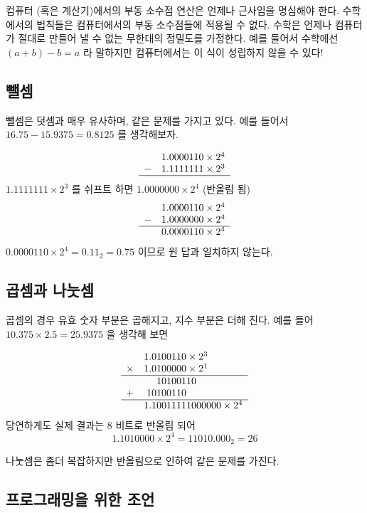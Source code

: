 컴퓨터 (혹은 계산기)에서의 부동 소수점 연산은 언제나 근사임을 명심해야 한다.
수학에서의 법칙들은 컴퓨터에서의 부동 소수점들에 적용될 수 없다. 수학은 언제나
컴퓨터가 절대로 만들어 낼 수 없는 무한대의 정밀도를 가정한다. 예를 들어서
수학에선 $(a + b) - b = a$ 라 말하지만 컴퓨터에서는 이 식이 성립하지 않을 수 있다!

\subsection{뺄셈}
뺄셈은 덧셈과 매우 유사하며, 같은 문제를 가지고 있다. 예를 들어서 $16.75 - 15.9375 = 0.8125$
를 생각해보자. 

\[
\begin{array}{rr}
 & 1.0000110 \times 2^4 \\
-& 1.1111111 \times 2^3 \\ \hline
\end{array}
\]
$1.1111111 \times 2^3$ 를 쉬프트 하면 $1.0000000 \times 2^4$ (반올림 됨)
\[
\begin{array}{rr}
 & 1.0000110 \times 2^4 \\
-& 1.0000000 \times 2^4 \\ \hline
 & 0.0000110 \times 2^4
\end{array}
\]
$0.0000110 \times 2^4 = 0.11_2 = 0.75$ 이므로 원 답과 일치하지 않는다. 

\subsection{곱셈과 나눗셈}

곱셈의 경우 유효 숫자 부분은 곱해지고, 지수 부분은 더해 진다. 예를 들어 
$10.375 \times 2.5 = 25.9375$ 을 생각해 보면 

\[
\begin{array}{rr@{}l}
 &  1.0&100110 \times 2^3 \\
\times &  1.0&100000 \times 2^1 \\ \hline
 &     &10100110 \\
+&   10&100110   \\ \hline
 &   1.1&0011111000000 \times 2^4
\end{array}
\]
당연하게도 실제 결과는 8 비트로 반올림 되어 
\[1.1010000 \times 2^4 = 11010.000_2 = 26 \]

나눗셈은 좀더 복잡하지만 반올림으로 인하여 같은 문제를 가진다. 

\subsection{프로그래밍을 위한 조언}

